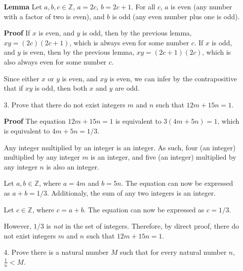 \documentclass[12pt]{article}
\begin{document}
\begin{enumerate}
  \item[\textbf{Lemma}] Let $a,b,c \in\mathbb{Z}$, $a=2c$, $b=2c+1$. For all $c$, $a$ is even (any number with a factor of two is even), and $b$ is odd (any even number plus one is odd).
\end{enumerate}

\begin{enumerate}
  \item[\textbf{Proof}] If $x$ is even, and $y$ is odd, then by the previous lemma, $xy=(2c)(2c+1)$, which is always even for some number $c$. If $x$ is odd, and $y$ is even, then by the previous lemma, $xy=(2c+1)(2c)$, which is also always even for some number $c$.
  \item[] Since either $x$ or $y$ is even, and $xy$ is even, we can infer by the contrapositive that if $xy$ is odd, then both $x$ and $y$ are odd.
\end{enumerate}

\begin{enumerate}
\item[3.] Prove that there do not exist integers $m$ and $n$ such that $12m + 15n = 1$.
\end{enumerate}

\begin{enumerate}
  \item[\textbf{Proof}] The equation $12m + 15n = 1$ is equivalent to $3(4m+5n)=1$, which is equivalent to $4m + 5n = 1/3$.
  \item[] Any integer multiplied by an integer is an integer. As such, four (an integer) multiplied by any integer $m$ is an integer, and five (an integer) multiplied by any integer $n$ is also an integer.
  \item[] Let $a,b\in\mathbb{Z}$, where $a=4m$ and $b=5n$. The equation can now be expressed as $a+b=1/3$. Additionaly, the sum of any two integers is an integer.
  \item[] Let $c\in\mathbb{Z}$, where $c=a+b$. The equation can now be expressed as $c=1/3$.
  \item[] However, $1/3$ is \textit{not} in the set of integers. Therefore, by direct proof, there do not exist integers $m$ and $n$ such that $12m + 15n = 1$.
\end{enumerate}

\begin{enumerate}
\item[4.] Prove there is a natural number $M$ such that for every natural number $n$, $\frac{1}{n} < M$.
\end{enumerate}
\end{document}
